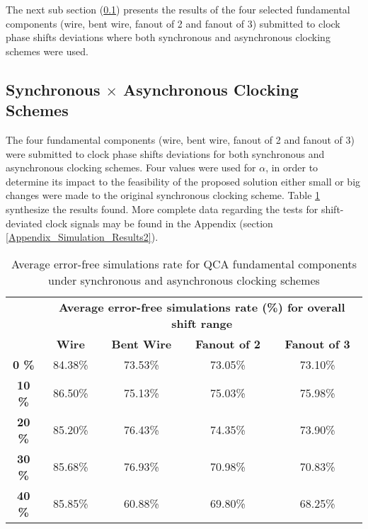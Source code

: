 The next sub section (\ref{subsection:Synchronous_Asynchronous_Clocking_Schemes}) presents the results of the four selected fundamental components (wire, bent wire, fanout of 2 and fanout of 3) submitted to clock phase shifts deviations where both synchronous and asynchronous clocking schemes were used.

\subsection{Synchronous $\times$ Asynchronous Clocking Schemes}
\label{subsection:Synchronous_Asynchronous_Clocking_Schemes}

The four fundamental components (wire, bent wire, fanout of 2 and fanout of 3) were submitted to clock phase shifts deviations for both synchronous and asynchronous clocking schemes. Four values were used for $\alpha$, in order to determine its impact to the feasibility of the proposed solution either small or big changes were made to the original synchronous clocking scheme. Table \ref{table:clocking_scheme_results} synthesize the results found. More complete data regarding the tests for shift-deviated clock signals may be found in the Appendix (section \ref{Appendix_Simulation_Results2}).

\begin{table}[H]
\centering
\caption{Average error-free simulations rate for QCA fundamental components under synchronous and asynchronous clocking schemes}
\label{table:clocking_scheme_results}
\begin{tabular}{|c|c|c|c|c|}
\hline
\multirow{2}{*}{} & \multicolumn{4}{c|}{\textbf{Average error-free simulations rate (\%) for overall shift range}} \\ \cline{2-5} 
                  & \textbf{Wire}       & \textbf{Bent Wire}    & \textbf{Fanout of 2}    & \textbf{Fanout of 3}   \\ \hline
\textbf{0 \%}     & 84.38\%    & 73.53\%      & 73.05\%        & 73.10\%       \\ \hline
\textbf{10 \%}    & 86.50\%    & 75.13\%      & 75.03\%        & 75.98\%       \\ \hline
\textbf{20 \%}    & 85.20\%    & 76.43\%      & 74.35\%        & 73.90\%       \\ \hline
\textbf{30 \%}    & 85.68\%    & 76.93\%      & 70.98\%        & 70.83\%       \\ \hline
\textbf{40 \%}    & 85.85\%    & 60.88\%      & 69.80\%        & 68.25\%       \\ \hline
\end{tabular}
\end{table}

